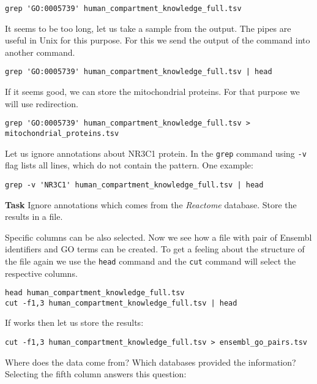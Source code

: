 \documentclass{article}\usepackage[]{graphicx}\usepackage[usenames,dvipsnames]{color}
\begin{document}
\begin{verbatim}
grep 'GO:0005739' human_compartment_knowledge_full.tsv
\end{verbatim}

It seems to be too long, let us take a sample from the output. The pipes are useful in Unix for this purpose. For this we send the output of the command into another command.

\begin{verbatim}
grep 'GO:0005739' human_compartment_knowledge_full.tsv | head
\end{verbatim}

If it seems good, we can store the mitochondrial proteins. For that purpose we will use redirection.

\begin{verbatim}
grep 'GO:0005739' human_compartment_knowledge_full.tsv > mitochondrial_proteins.tsv
\end{verbatim}

Let us ignore annotations about NR3C1 protein. In the \verb+grep+ command using \verb+-v+ flag lists all lines, which do not contain the pattern. One example:

\begin{verbatim}
grep -v 'NR3C1' human_compartment_knowledge_full.tsv | head
\end{verbatim}

\textbf{Task} Ignore annotations which comes from the \emph{Reactome} database. Store the results in a file.

Specific columns can be also selected. Now we see how a file with pair of Ensembl identifiers and GO terms can be created. To get a feeling about the structure of the file again we use the \verb+head+ command and the \verb+cut+ command will select the respective columns.

\begin{verbatim}
head human_compartment_knowledge_full.tsv
cut -f1,3 human_compartment_knowledge_full.tsv | head
\end{verbatim}

If works then let us store the results:

\begin{verbatim}
cut -f1,3 human_compartment_knowledge_full.tsv > ensembl_go_pairs.tsv
\end{verbatim}

Where does the data come from? Which databases provided the information? Selecting the fifth column answers this question:
\end{document}
